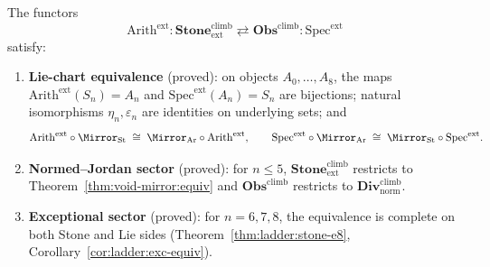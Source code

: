 \begin{theorem}\label{thm:void-mirror:equiv-ext}
The functors
\[
  \mathrm{Arith}^{\mathrm{ext}}:
  \mathbf{Stone}^{\mathrm{climb}}_{\mathrm{ext}}\rightleftarrows
  \mathbf{Obs}^{\mathrm{climb}}:
  \mathrm{Spec}^{\mathrm{ext}}
\]
satisfy:
\begin{enumerate}[label=(\roman*),leftmargin=*]
  \item \textbf{Lie-chart equivalence} (proved): on objects
    $A_0,\ldots,A_8$, the maps
    $\mathrm{Arith}^{\mathrm{ext}}(S_n)=A_n$ and
    $\mathrm{Spec}^{\mathrm{ext}}(A_n)=S_n$ are bijections; natural isomorphisms
    $\eta_n,\varepsilon_n$ are identities on underlying sets; and
    \[
      \mathrm{Arith}^{\mathrm{ext}}\circ\Mirror_{\mathrm{St}}\;\cong\;
      \Mirror_{\mathrm{Ar}}\circ\mathrm{Arith}^{\mathrm{ext}},
      \qquad
      \mathrm{Spec}^{\mathrm{ext}}\circ\Mirror_{\mathrm{Ar}}\;\cong\;
      \Mirror_{\mathrm{St}}\circ\mathrm{Spec}^{\mathrm{ext}}.
    \]
  \item \textbf{Normed--Jordan sector} (proved): for $n\leq5$,
    $\mathbf{Stone}^{\mathrm{climb}}_{\mathrm{ext}}$ restricts to
    Theorem~\ref{thm:void-mirror:equiv} and
    $\mathbf{Obs}^{\mathrm{climb}}$ restricts to
    $\mathbf{Div}^{\mathrm{climb}}_{\mathrm{norm}}$.
  \item \textbf{Exceptional sector} (proved): for $n=6,7,8$, the equivalence
    is complete on both Stone and Lie sides
    (Theorem~\ref{thm:ladder:stone-e8},
    Corollary~\ref{cor:ladder:exc-equiv}).
\end{enumerate}
\end{theorem}

